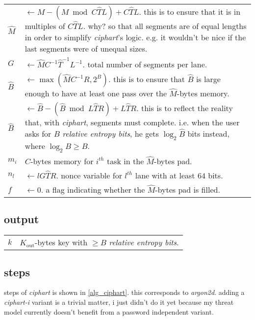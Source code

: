 \documentclass[twocolumn]{article}
\DeclareMathOperator{\maxf}{max}
\begin{document}
\begin{tabularx}{\columnwidth}{lX}
    $\hat M$    & $\gets M - (M \bmod C\hat TL) + C\hat TL$.  this is to
                    ensure that it is in multiples of $C\hat TL$.  why?  so
                    that all segments are of equal lengths in order to
                    simplify \emph{ciphart}'s logic.  e.g. it wouldn't be
                    nice if the last segments were of unequal sizes.\\
    $G$         & $\gets \hat MC^{-1}\hat T^{-1}L^{-1}$.  total number of
                    segments per lane.\\
    $\hat B$    & $\gets \maxf(\hat MC^{-1}R, 2^B)$.  this is to ensure
                    that $\hat B$ is large enough to have at least one pass
                    over the $\hat M$-bytes memory.\\
    $\hat B$    & $\gets \hat B - (\hat B \bmod L\hat TR) +
                    L\hat TR$.  this is to reflect the reality that, with
                    \emph{ciphart}, segments must complete.  i.e. when the
                    user asks for $B$ \emph{relative entropy bits}, he gets
                    $\log_2 \hat B$ bits instead, where $\log_2\hat B \ge
                    B$.\\
    $m_i$       & $C$-bytes memory for $i^{th}$ task in the $\hat M$-bytes
                    pad.\\
    $n_l$       & $\gets lG\hat TR$.  nonce variable for $l^{th}$ lane with
                    at least $64$ bits.\\
    $f$         & $\gets 0$.  a flag indicating whether the $\hat M$-bytes
                    pad is filled.\\
\end{tabularx}

\subsection{output}
\begin{tabular}{ll}
$k$ & $K_{\text{out}}$-bytes key with $\ge B$ \emph{relative entropy
        bits}.\\
\end{tabular}

\subsection{steps}
steps of \emph{ciphart} is shown in \cref{alg_ciphart}.  this corresponds
to \emph{argon2d}.  adding a \emph{ciphart-i} variant is a trivial matter,
i just didn't do it yet because my threat model currently doesn't benefit
from a password independent variant.
\end{document}
